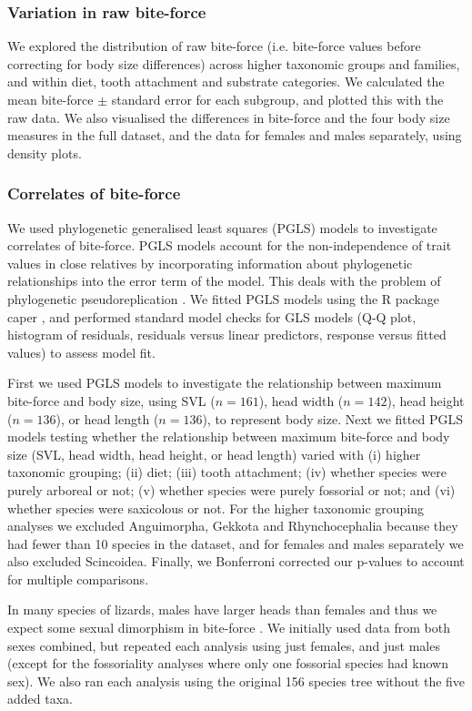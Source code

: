 \documentclass[a4paper, 12pt]{article}
\begin{document}
\subsubsection{Variation in raw bite-force}
We explored the distribution of raw bite-force (i.e. bite-force values before correcting for body size differences) across higher taxonomic groups and families, and within diet, tooth attachment and substrate categories. 
We calculated the mean bite-force $\pm$ standard error for each subgroup, and plotted this with the raw data. 
We also visualised the differences in bite-force and the four body size measures in the full dataset, and the data for females and males separately, using density plots.

\subsubsection{Correlates of bite-force}
We used phylogenetic generalised least squares (PGLS) models to investigate correlates of bite-force. 
PGLS models account for the non-independence of trait values in close relatives by incorporating information about phylogenetic relationships into the error term of the model. This deals with the problem of phylogenetic pseudoreplication \citep{harvey1991comparative}. 
We fitted PGLS models using the R package caper \citep{orme2018caper}, and performed standard model checks for GLS models (Q-Q plot, histogram of residuals, residuals versus linear predictors, response versus fitted values) to assess model fit. 

First we used PGLS models to investigate the relationship between maximum bite-force and body size, using SVL ($n = 161$), head width ($n = 142$), head height ($n = 136$), or head length ($n = 136$), to represent body size. 
Next we fitted PGLS models testing whether the relationship between maximum bite-force and body size (SVL, head width, head height, or head length) varied with (i) higher taxonomic grouping; (ii) diet; (iii) tooth attachment; (iv) whether species were purely arboreal or not; (v) whether species were purely fossorial or not; and (vi) whether species were saxicolous or not. 
For the higher taxonomic grouping analyses we excluded Anguimorpha, Gekkota and Rhynchocephalia because they had fewer than 10 species in the dataset, and for females and males separately we also excluded Scincoidea. 
Finally, we Bonferroni corrected our p-values to account for multiple comparisons.

In many species of lizards, males have larger heads than females and thus we expect some sexual dimorphism in bite-force \citep[e.g.][]{herrel1999sexual,verwaijen2002relationships}. 
We initially used data from both sexes combined, but repeated each analysis using just females, and just males (except for the fossoriality analyses where only one fossorial species had known sex). 
We also ran each analysis using the original 156 species tree without the five added taxa. 
\end{document}
